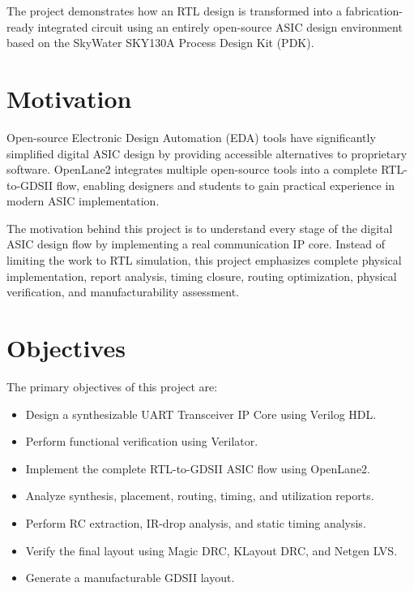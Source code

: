 The project demonstrates how an RTL design is transformed into a fabrication-ready integrated circuit using an entirely open-source ASIC design environment based on the SkyWater SKY130A Process Design Kit (PDK).


\section{Motivation}

Open-source Electronic Design Automation (EDA) tools have significantly simplified digital ASIC design by providing accessible alternatives to proprietary software. OpenLane2 integrates multiple open-source tools into a complete RTL-to-GDSII flow, enabling designers and students to gain practical experience in modern ASIC implementation.

The motivation behind this project is to understand every stage of the digital ASIC design flow by implementing a real communication IP core. Instead of limiting the work to RTL simulation, this project emphasizes complete physical implementation, report analysis, timing closure, routing optimization, physical verification, and manufacturability assessment.


\section{Objectives}

The primary objectives of this project are:

\begin{itemize}

\item Design a synthesizable UART Transceiver IP Core using Verilog HDL.

\item Perform functional verification using Verilator.

\item Implement the complete RTL-to-GDSII ASIC flow using OpenLane2.

\item Analyze synthesis, placement, routing, timing, and utilization reports.

\item Perform RC extraction, IR-drop analysis, and static timing analysis.

\item Verify the final layout using Magic DRC, KLayout DRC, and Netgen LVS.

\item Generate a manufacturable GDSII layout.

\end{itemize}

